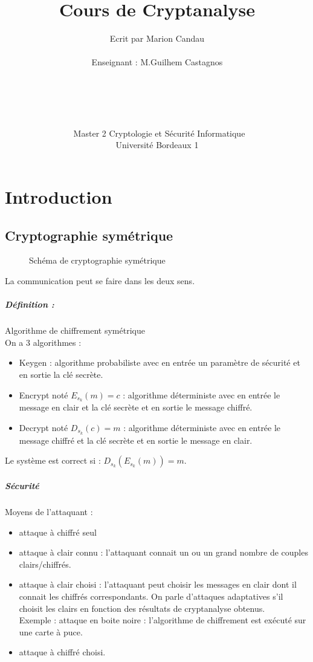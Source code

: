 \documentclass[12pt,a4paper]{report}
\title{\Huge{Cours de Cryptanalyse}}
\author{Ecrit par Marion Candau \\\\
Enseignant : M.Guilhem Castagnos\\\\\\\\\\\\\
Master 2 Cryptologie et Sécurité Informatique\\
Université Bordeaux 1}
\begin{document}
\maketitle
\tableofcontents
\newpage 

\chapter{Introduction}
\section{Cryptographie symétrique}

\begin{figure}[h]
	\centering
  \scalebox{0.8}{}	
  \caption{Schéma de cryptographie symétrique}
\end{figure}
La communication peut se faire dans les deux sens.
\paragraph{Définition : }
Algorithme de chiffrement symétrique \\
On a 3 algorithmes :
\begin{itemize}
\item Keygen : algorithme probabiliste avec en entrée un paramètre de sécurité et en sortie la clé secrète.
\item Encrypt noté $E_{s_k}(m) = c $ : algorithme déterministe avec en entrée le message en clair et la clé secrète et en sortie le message chiffré.
\item Decrypt noté $D_{s_k}(c)= m $ : algorithme déterministe avec en entrée le message chiffré et la clé secrète et en sortie le message en clair.
\end{itemize}
Le système est correct si : $D_{s_k}(E_{s_k}(m))=m $.

\paragraph{Sécurité\\}
Moyens de l'attaquant :
\begin{itemize}
\item attaque à chiffré seul
\item attaque à clair connu : l'attaquant connait un ou un grand nombre de couples clairs/chiffrés.
\item attaque à clair choisi : l'attaquant peut choisir les messages en clair dont il connait les chiffrés correspondants. On parle d'attaques adaptatives s'il choisit les clairs en fonction des résultats de cryptanalyse obtenus.\\
Exemple : attaque en boite noire : l'algorithme de chiffrement est exécuté sur une carte à puce.
\item attaque à chiffré choisi.
\end{itemize}
\end{document}
